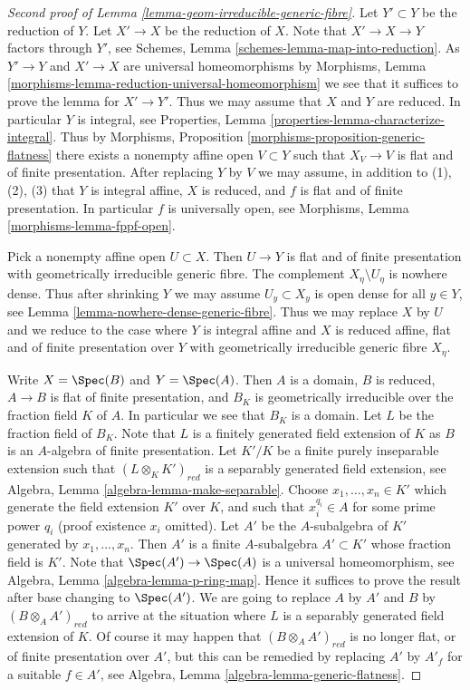 \begin{proof}[Second proof of Lemma \ref{lemma-geom-irreducible-generic-fibre}]
Let $Y' \subset Y$ be the reduction of $Y$. Let $X' \to X$ be the reduction
of $X$. Note that $X' \to X  \to Y$ factors through $Y'$, see
Schemes, Lemma \ref{schemes-lemma-map-into-reduction}.
As $Y' \to Y$ and $X' \to X$ are universal
homeomorphisms by
Morphisms, Lemma \ref{morphisms-lemma-reduction-universal-homeomorphism}
we see that it suffices to prove the lemma for $X' \to Y'$. Thus
we may assume that $X$ and $Y$ are reduced. In particular $Y$ is integral, see
Properties, Lemma \ref{properties-lemma-characterize-integral}.
Thus by
Morphisms, Proposition \ref{morphisms-proposition-generic-flatness}
there exists a nonempty affine open $V \subset Y$ such that $X_V \to V$ is
flat and of finite presentation. After replacing $Y$ by $V$ we may
assume, in addition to (1), (2), (3) that $Y$ is integral affine, $X$
is reduced, and $f$ is flat and of finite presentation. In particular
$f$ is universally open, see
Morphisms, Lemma \ref{morphisms-lemma-fppf-open}.

\medskip\noindent
Pick a nonempty affine open $U \subset X$. Then $U \to Y$ is flat and of
finite presentation with geometrically irreducible generic fibre.
The complement $X_\eta \setminus U_\eta$ is nowhere dense. Thus after
shrinking $Y$ we may assume $U_y \subset X_y$ is open dense for all
$y \in Y$, see
Lemma \ref{lemma-nowhere-dense-generic-fibre}.
Thus we may replace $X$ by $U$ and we reduce to the
case where $Y$ is integral affine and $X$ is reduced affine, flat and of finite
presentation over $Y$ with geometrically irreducible generic fibre $X_\eta$.

\medskip\noindent
Write $X = \Spec(B)$ and $Y = \Spec(A)$. Then $A$ is a domain,
$B$ is reduced, $A \to B$ is flat of finite presentation, and $B_K$ is
geometrically irreducible over the fraction field $K$ of $A$.
In particular we see that $B_K$ is a domain. Let $L$ be the fraction field
of $B_K$. Note that
$L$ is a finitely generated field extension of $K$ as $B$ is an $A$-algebra
of finite presentation. Let $K'/K$ be a finite purely inseparable
extension such that $(L \otimes_K K')_{red}$ is a separably generated field
extension, see
Algebra, Lemma \ref{algebra-lemma-make-separable}.
Choose $x_1, \ldots, x_n \in K'$ which generate the field extension
$K'$ over $K$, and such that $x_i^{q_i} \in A$ for some prime power
$q_i$ (proof existence $x_i$ omitted). Let $A'$ be the $A$-subalgebra
of $K'$ generated by $x_1, \ldots, x_n$. Then $A'$ is a finite
$A$-subalgebra $A' \subset K'$ whose fraction field is $K'$. Note that
$\Spec(A') \to \Spec(A)$ is a universal homeomorphism, see
Algebra, Lemma \ref{algebra-lemma-p-ring-map}.
Hence it suffices to prove the result after base changing to $\Spec(A')$.
We are going to replace $A$ by $A'$ and $B$ by $(B \otimes_A A')_{red}$
to arrive at the situation where $L$ is a separably generated field extension
of $K$. Of course it may happen that $(B \otimes_A A')_{red}$ is no longer
flat, or of finite presentation over $A'$, but this can be remedied by
replacing $A'$ by  $A'_f$ for a suitable $f \in A'$, see
Algebra, Lemma \ref{algebra-lemma-generic-flatness}.


\end{proof}
